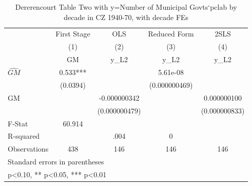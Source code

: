 \begin{table}[htbp]\centering
\def\sym#1{\ifmmode^{#1}\else\(^{#1}\)\fi}
\caption{Dererencourt Table Two with y=Number of Municipal Govts`pclab by decade in CZ 1940-70, with decade FEs}
\begin{tabular}{l*{4}{c}}
\toprule
                    & First Stage   &         OLS   &Reduced Form   &        2SLS   \\
                    &\multicolumn{1}{c}{(1)}&\multicolumn{1}{c}{(2)}&\multicolumn{1}{c}{(3)}&\multicolumn{1}{c}{(4)}\\
                    &\multicolumn{1}{c}{GM}&\multicolumn{1}{c}{y\_L2}&\multicolumn{1}{c}{y\_L2}&\multicolumn{1}{c}{y\_L2}\\
\midrule
$\hat{GM}$          &       0.533***&               &    5.61e-08   &               \\
                    &    (0.0394)   &               &(0.000000469)   &               \\
\addlinespace
GM                  &               &-0.000000342   &               & 0.000000100   \\
                    &               &(0.000000479)   &               &(0.000000833)   \\
\midrule
F-Stat              &      60.914   &               &               &               \\
R-squared           &               &        .004   &           0   &               \\
Observations        &         438   &         146   &         146   &         146   \\
\bottomrule
\multicolumn{5}{l}{\footnotesize Standard errors in parentheses}\\
\multicolumn{5}{l}{\footnotesize * p<0.10, ** p<0.05, *** p<0.01}\\
\end{tabular}
\end{table}
